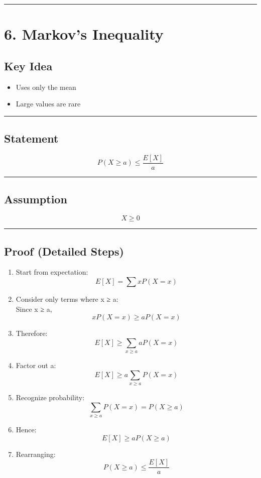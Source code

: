 \documentclass[12pt]{article}
\begin{document}
\hrule

\section*{6. Markov’s Inequality}

\subsection*{Key Idea}

\begin{itemize}
\item Uses only the mean
\item Large values are rare
\end{itemize}

\hrule

\subsection*{Statement}

\[
P(X \geq a) \leq \frac{E[X]}{a}
\]

\hrule

\subsection*{Assumption}

\[
X \geq 0
\]

\hrule

\subsection*{Proof (Detailed Steps)}

\begin{enumerate}
\item Start from expectation:
\[
E[X] = \sum x P(X = x)
\]

\item Consider only terms where x ≥ a: \\
Since x ≥ a,
\[
x P(X=x) \geq a P(X=x)
\]

\item Therefore:
\[
E[X] \geq \sum_{x \geq a} a P(X=x)
\]

\item Factor out a:
\[
E[X] \geq a \sum_{x \geq a} P(X=x)
\]

\item Recognize probability:
\[
\sum_{x \geq a} P(X=x) = P(X \geq a)
\]

\item Hence:
\[
E[X] \geq a P(X \geq a)
\]

\item Rearranging:
\[
P(X \geq a) \leq \frac{E[X]}{a}
\]
\end{enumerate}
\end{document}
